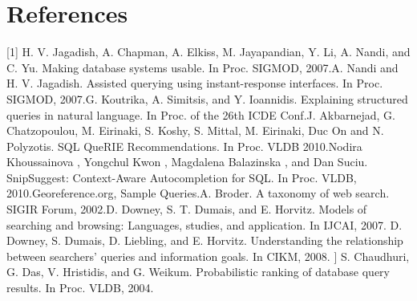 \documentclass{acm_proc_article-sp}
\begin{document}
\section{References}
[1] H. V. Jagadish, A. Chapman, A. Elkiss, M. Jayapandian, Y. Li, A. Nandi, and C. Yu. Making database systems usable. In Proc. SIGMOD, 2007.\newline
[2] A. Nandi and H. V. Jagadish. Assisted querying using instant-response interfaces. In Proc. SIGMOD, 2007.\newline
[3] G. Koutrika, A. Simitsis, and Y. Ioannidis. Explaining structured queries in natural language. In Proc. of the 26th ICDE Conf.\newline
[4] J. Akbarnejad, G. Chatzopoulou, M. Eirinaki, S. Koshy, S. Mittal, M. Eirinaki, Duc On and N. Polyzotis. SQL QueRIE Recommendations. In Proc. VLDB 2010.\newline
[5] Nodira Khoussainova , Yongchul Kwon , Magdalena Balazinska , and Dan Suciu. SnipSuggest: Context-Aware Autocompletion for SQL. In Proc. VLDB, 2010.\newline
[6] Georeference.org, Sample Queries.\newline
[7] A. Broder. A taxonomy of web search. SIGIR Forum, 2002.\newline
[8] D. Downey, S. T. Dumais, and E. Horvitz. Models of searching and browsing: Languages, studies, and application. In IJCAI, 2007. \newline
[9] D. Downey, S. Dumais, D. Liebling, and E. Horvitz. Understanding the relationship between searchers’ queries and information goals. In CIKM, 2008. \newline
[10] ] S. Chaudhuri, G. Das, V. Hristidis, and G. Weikum. Probabilistic ranking of database query results. In Proc. VLDB, 2004.
\end{document}
